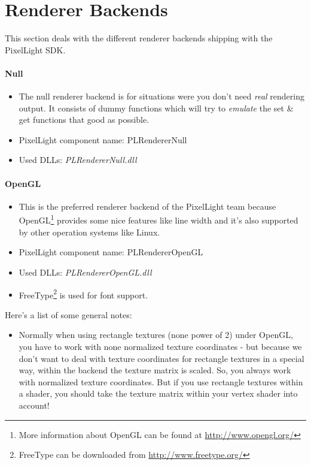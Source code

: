\section{Renderer Backends}
This section deals with the different renderer backends shipping with the PixelLight \ac{SDK}.


\paragraph{Null}
\begin{itemize}
\item The null renderer backend is for situations were you don't need \emph{real} rendering output. It consists of dummy functions which will try to \emph{emulate} the set \& get functions that good as possible.
\item PixelLight component name: PLRendererNull
\item Used \ac{DLL}s: \emph{PLRendererNull.dll}
\end{itemize}


\paragraph{OpenGL}
\begin{itemize}
\item This is the preferred renderer backend of the PixelLight team because OpenGL\footnote{More information about OpenGL can be found at \url{http://www.opengl.org/}} provides some nice features like line width and it's also supported by other operation systems like Linux.
\item PixelLight component name: PLRendererOpenGL
\item Used \ac{DLL}s: \emph{PLRendererOpenGL.dll}
\item FreeType\footnote{FreeType can be downloaded from \url{http://www.freetype.org/}} is used for font support.
\end{itemize}

Here's a list of some general notes:
\begin{itemize}
\item Normally when using rectangle textures (none power of 2) under OpenGL, you have to work with none normalized texture coordinates - but because we don't want to deal with texture coordinates for rectangle textures in a special way, within the backend the texture matrix is scaled. So, you always work with normalized texture coordinates. But if you use rectangle textures within a shader, you should take the texture matrix within your vertex shader into account!
\end{itemize}

